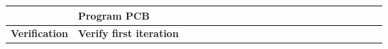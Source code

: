 \begin{table}[ht!]
\begin{tabular}{lp{2.5in}|llllllllllllllllllll|}
    \multicolumn{1}{|l|}{\cellcolor[HTML]{00E2FF}\textbf{}}                & \cellcolor[HTML]{00E2FF}\textbf{Program PCB}                               & \multicolumn{1}{l|}{}                                   & \multicolumn{1}{l|}{}                                   & \multicolumn{1}{l|}{}                                   & \multicolumn{1}{l|}{}                                   & \multicolumn{1}{l|}{}                                   & \multicolumn{1}{l|}{}                                   & \multicolumn{1}{l|}{\cellcolor[HTML]{F8A102}}           & \multicolumn{1}{l|}{}                                   & \multicolumn{1}{l|}{}                                   & \multicolumn{1}{l|}{\cellcolor[HTML]{F8A102}}            & \multicolumn{1}{l|}{}                                    & \multicolumn{1}{l|}{}                                    & \multicolumn{1}{l|}{\cellcolor[HTML]{F8A102}}            & \multicolumn{1}{l|}{}                                    & \multicolumn{1}{l|}{}                                    & \multicolumn{1}{l|}{\cellcolor[HTML]{F8A102}}            & \multicolumn{1}{l|}{}                                    & \multicolumn{1}{l|}{}                                    & \multicolumn{1}{l|}{}                                    &             \\ \hline
    \multicolumn{1}{|l|}{\cellcolor[HTML]{00E2FF}\textbf{Verification}}    & \cellcolor[HTML]{00E2FF}\textbf{Verify first iteration}                    & \multicolumn{1}{l|}{}                                   & \multicolumn{1}{l|}{}                                   & \multicolumn{1}{l|}{}                                   & \multicolumn{1}{l|}{}                                   & \multicolumn{1}{l|}{}                                   & \multicolumn{1}{l|}{}                                   & \multicolumn{1}{l|}{}                                   & \multicolumn{1}{l|}{\cellcolor[HTML]{F8A102}}           & \multicolumn{1}{l|}{}                                   & \multicolumn{1}{l|}{}                                    & \multicolumn{1}{l|}{}                                    & \multicolumn{1}{l|}{}                                    & \multicolumn{1}{l|}{}                                    & \multicolumn{1}{l|}{}                                    & \multicolumn{1}{l|}{}                                    & \multicolumn{1}{l|}{}                                    & \multicolumn{1}{l|}{}                                    & \multicolumn{1}{l|}{}                                    & \multicolumn{1}{l|}{}                                    &             \\ \hline

\end{tabular}
\end{table}
